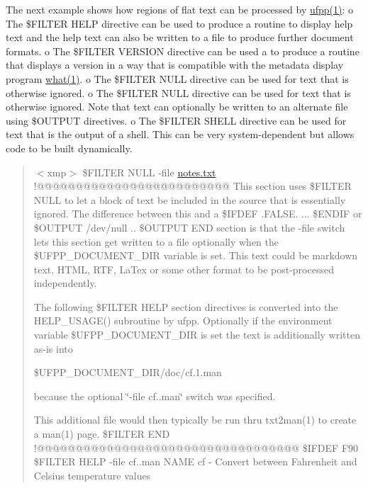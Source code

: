 The next example shows how regions of flat text can be processed by \hyperlink{ufpp__overview_81_8txt_a97c20a96bcab81bc74c9d64b001f1202}{ufpp(1)}\+: o The \$\+F\+I\+L\+T\+ER H\+E\+LP directive can be used to produce a routine to display help text and the help text can also be written to a file to produce further document formats. o The \$\+F\+I\+L\+T\+ER V\+E\+R\+S\+I\+ON directive can be used a to produce a routine that displays a version in a way that is compatible with the metadata display program \hyperlink{what__overview_81_8txt_a8cdf8efd1b900d6dce77a3f97edb2216}{what(1)}. o The \$\+F\+I\+L\+T\+ER N\+U\+LL directive can be used for text that is otherwise ignored. o The \$\+F\+I\+L\+T\+ER N\+U\+LL directive can be used for text that is otherwise ignored. Note that text can optionally be written to an alternate file using \$\+O\+U\+T\+P\+UT directives. o The \$\+F\+I\+L\+T\+ER S\+H\+E\+LL directive can be used for text that is the output of a shell. This can be very system-\/dependent but allows code to be built dynamically. \begin{quote}
$<$xmp$>$ \$\+F\+I\+L\+T\+ER N\+U\+LL -\/file \hyperlink{notes_8txt}{notes.\+txt} !@@@@@@@@@@@@@@@@@@@@@@@@@ This section uses \$\+F\+I\+L\+T\+ER N\+U\+LL to let a block of text be included in the source that is essentially ignored. The difference between this and a \$\+I\+F\+D\+EF .F\+A\+L\+SE. ... \$\+E\+N\+D\+IF or \$\+O\+U\+T\+P\+UT /dev/null .. \$\+O\+U\+T\+P\+UT E\+ND section is that the -\/file switch lets this section get written to a file optionally when the \$\+U\+F\+P\+P\+\_\+\+D\+O\+C\+U\+M\+E\+N\+T\+\_\+\+D\+IR variable is set. This text could be markdown text, H\+T\+ML, R\+TF, La\+Tex or some other format to be post-\/processed independently.

The following \$\+F\+I\+L\+T\+ER H\+E\+LP section directives is converted into the H\+E\+L\+P\+\_\+\+U\+S\+A\+G\+E() subroutine by ufpp. Optionally if the environment variable \$\+U\+F\+P\+P\+\_\+\+D\+O\+C\+U\+M\+E\+N\+T\+\_\+\+D\+IR is set the text is additionally written as-\/is into

\$\+U\+F\+P\+P\+\_\+\+D\+O\+C\+U\+M\+E\+N\+T\+\_\+\+D\+IR/doc/cf.1.\+man

because the optional \char`\"{}-\/file cf..\+man\char`\"{} switch was specified.

This additional file would then typically be run thru txt2man(1) to create a man(1) page. \$\+F\+I\+L\+T\+ER E\+ND !@@@@@@@@@@@@@@@@@@@@@@@@@@@@@@@@@@ \$\+I\+F\+D\+EF F90 \$\+F\+I\+L\+T\+ER H\+E\+LP -\/file cf..\+man N\+A\+ME cf -\/ Convert between Fahrenheit and Celsius temperature values


\end{quote}
